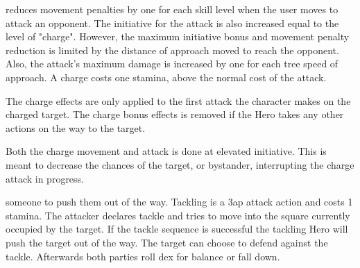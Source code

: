  reduces movement penalties by one for each skill level when the user moves to attack an opponent. The initiative for the attack is also increased equal to the level of "charge". However, the maximum initiative bonus and movement penalty reduction is limited by the distance of approach moved to reach the opponent. Also, the attack's maximum damage is increased by one for each tree speed of approach. A charge costs one stamina, above the normal cost of the attack.

The charge effects are only applied to the first attack the character makes on the charged target. The charge bonus effects is removed if the Hero takes any other actions on the way to the target.

Both the charge movement and attack is done at elevated initiative. This is meant to decrease the chances of the target, or bystander, interrupting the charge attack in progress.




 someone to push them out of the way. Tackling is a 3ap attack action and costs 1 stamina. The attacker declares tackle and tries to move into the square currently occupied by the target. If the tackle sequence is successful the tackling Hero will push the target out of the way.
The target can choose to defend against the tackle. Afterwards both parties roll dex for balance or fall down.


